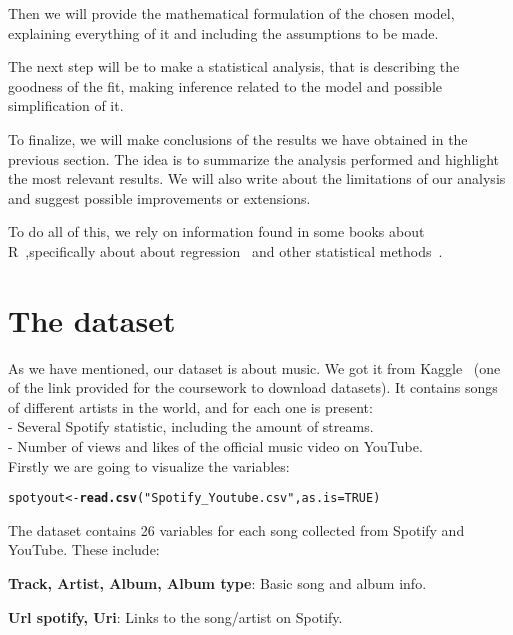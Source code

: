 \documentclass[11pt]{article}\usepackage[]{graphicx}\usepackage[]{xcolor}
\makeatletter
\newcommand{\hlnum}[1]{\textcolor[rgb]{0.686,0.059,0.569}{#1}}%
\newcommand{\hlsng}[1]{\textcolor[rgb]{0.192,0.494,0.8}{#1}}%
\newcommand{\hldef}[1]{\textcolor[rgb]{0.345,0.345,0.345}{#1}}%
\newcommand{\hlkwb}[1]{\textcolor[rgb]{0.69,0.353,0.396}{#1}}%
\newcommand{\hlkwc}[1]{\textcolor[rgb]{0.333,0.667,0.333}{#1}}%
\newcommand{\hlkwd}[1]{\textcolor[rgb]{0.737,0.353,0.396}{\textbf{#1}}}%
\newenvironment{kframe}{%
 \def\at@end@of@kframe{}%
 \ifinner\ifhmode%
  \def\at@end@of@kframe{\end{minipage}}%
  \begin{minipage}{\columnwidth}%
 \fi\fi%
 \def\FrameCommand##1{\hskip\@totalleftmargin \hskip-\fboxsep
 \colorbox{shadecolor}{##1}\hskip-\fboxsep
     \hskip-\linewidth \hskip-\@totalleftmargin \hskip\columnwidth}%
 \MakeFramed {\advance\hsize-\width
   \@totalleftmargin\z@ \linewidth\hsize
   \@setminipage}}%
 {\par\unskip\endMakeFramed%
 \at@end@of@kframe}
\newenvironment{knitrout}{}{} %
\makeatother
\begin{document}
Then we will provide the mathematical formulation of the chosen model, explaining everything of it and including the assumptions to be made. 

The next step will be to make a statistical analysis, that is describing the goodness of the fit, making inference related to the model and possible simplification of it.

To finalize, we will make conclusions of the results we have obtained in the previous section. The idea is to summarize the analysis performed and highlight the most relevant results. We will also write about the limitations of our analysis and suggest possible improvements or extensions.

To do all of this, we rely on information found in some books about R~\cite{book1},specifically about about regression~\cite{book2} and other statistical methods~\cite{book3}.


\newpage

\section{The dataset}
As we have mentioned, our dataset is about music. We got it from Kaggle~\cite{Dataset} (one of the link provided for the coursework to download datasets).
It contains songs of different artists in the world, and for each one is present:\\
 - Several Spotify statistic, including the amount of streams.\\
 - Number of views and likes of the official music video on YouTube.\\

Firstly we are going to visualize the variables: 
\begin{knitrout}
\color{fgcolor}\begin{kframe}
\begin{alltt}
\hldef{spotyout}\hlkwb{<-} \hlkwd{read.csv}\hldef{(}\hlsng{"Spotify_Youtube.csv"}\hldef{,} \hlkwc{as.is}\hldef{=}\hlnum{TRUE}\hldef{)}
\end{alltt}
\end{kframe}
\end{knitrout}
The dataset contains 26 variables for each song collected from Spotify and YouTube. These include:

\textbf{Track, Artist, Album, Album type}: Basic song and album info.

\textbf{Url spotify, Uri}: Links to the song/artist on Spotify.
\end{document}
